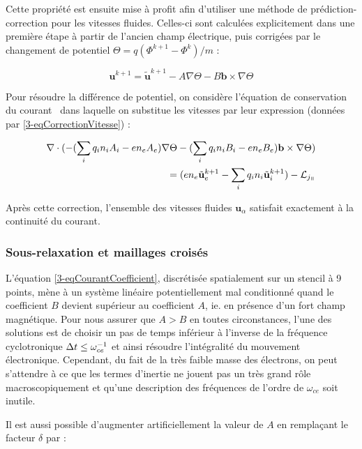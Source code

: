 \begin{refsection}
Cette propriété est ensuite mise à profit afin d'utiliser une méthode de
prédiction-correction pour les vitesses fluides. Celles-ci sont calculées
explicitement dans une première étape à partir de l'ancien champ électrique,
puis corrigées par le changement de potentiel
$\Theta=q(\Phi^{k+1}-\Phi^k)/m$ :

\begin{equation}
\label{3-eqCorrectionVitesse}
\mathbf u^{k+1} = \tilde{\mathbf u}^{k+1}-A\nabla
\Theta-B\mathbf b\times\nabla
\Theta
\end{equation}

Pour résoudre la différence de potentiel, on considère l'équation de
conservation du courant~ dans laquelle on substitue les
vitesses par leur expression (données par \eqref{3-eqCorrectionVitesse}) :

\begin{equation}
\begin{split}
\label{3-eqCourantCoefficient}
\nabla\cdot(-(\sum_iq_in_iA_i-en_eA_e)\nabla
\Theta-(\sum_iq_in_iB_i-en_eB_e)\mathbf
b\times\nabla
\Theta)\\=(en_e\tilde{\mathbf
u}_e^{k+1}-\sum_iq_in_i\tilde{\mathbf u}_i^{k+1})-\mathcal L_{j_\para}
\end{split}
\end{equation}

Après cette correction, l'ensemble des vitesses fluides $\mathbf u_\alpha$
satisfait exactement à la continuité du courant. 

\subsubsection{Sous-relaxation et maillages croisés}
L'équation \eqref{3-eqCourantCoefficient}, discrétisée spatialement sur un
stencil à 9 points, mène à un système linéaire potentiellement mal conditionné
quand le coefficient $B$ devient supérieur au coefficient $A$, ie. en présence
d'un fort champ magnétique. Pour nous assurer que $A>B$ en toutes circonstances,
l'une des solutions est de choisir un pas de temps inférieur à l'inverse de la
fréquence cyclotronique $\Delta t\leq\omega_{ce}^{{-1}}$ et
ainsi résoudre l'intégralité du mouvement électronique. Cependant, du fait de la
très faible masse des électrons, on peut s'attendre à ce que les termes
d'inertie ne jouent pas un très grand rôle macroscopiquement et qu'une
description des fréquences de l'ordre de $\omega_{ce}$ soit inutile.

Il est aussi possible d'augmenter artificiellement la valeur de $A$ en
remplaçant le facteur $\delta$ par :


\end{refsection}
